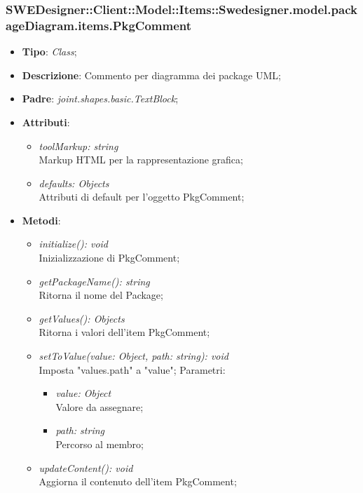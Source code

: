 \documentclass[../DefinizioneDiProdotto.tex]{subfiles}
\begin{document}
			\subsubsection{SWEDesigner::Client::Model::Items::Swedesigner.model.packageDiagram.items.PkgComment}
			\hypertarget{SWEDesigner::Client::Model::Items::Swedesigner.model.packageDiagram.items.PkgComment}{}
			\begin{itemize}
				\item \textbf{Tipo}: \emph{Class};
				\item \textbf{Descrizione}: Commento per diagramma dei package UML;
				\item \textbf{Padre}: \emph{joint.shapes.basic.TextBlock};
				\item \textbf{Attributi}:
				\begin{itemize}
					\item \emph{toolMarkup: string}\\ 
					Markup HTML per la rappresentazione grafica;
					\item \emph{defaults: Objects}\\
					Attributi di default per l'oggetto PkgComment;
				\end{itemize}
				\item \textbf{Metodi}:
				\begin{itemize}
					\item \emph{initialize(): void}\\
					Inizializzazione di PkgComment;
					\item \emph{getPackageName(): string}\\
					Ritorna il nome del Package;
					\item \emph{getValues(): Objects}\\
					Ritorna i valori dell'item PkgComment;
					\item \emph{setToValue(value: Object, path: string): void}\\
					Imposta "values.path" a "value";
					Parametri:
					\begin{itemize}
						\item \emph{value: Object} \\
						Valore da assegnare;
						\item \emph{path: string} \\
						Percorso al membro;
					\end{itemize}
					\item \emph{updateContent(): void}\\
					Aggiorna il contenuto dell'item PkgComment;
				\end{itemize}
			\end{itemize}
			
\end{document}
